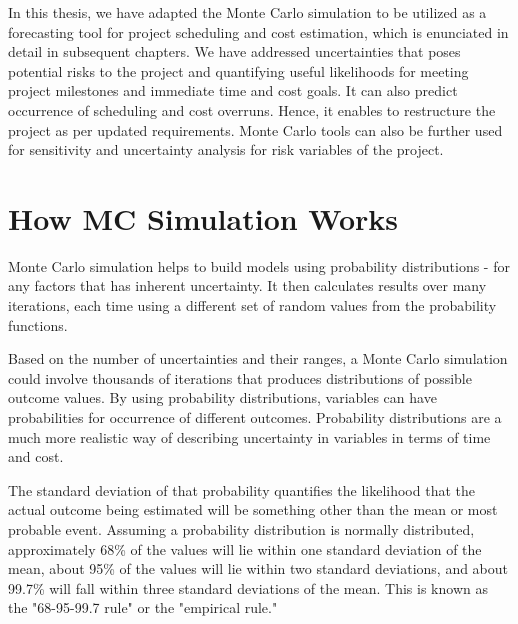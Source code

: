 In this thesis, we have adapted the Monte Carlo simulation to be utilized as a forecasting tool for project scheduling and cost estimation, which is enunciated in detail in subsequent chapters. We have addressed uncertainties that poses potential risks to the project and quantifying useful likelihoods for meeting project milestones and immediate time and cost goals. It can also predict occurrence of scheduling and cost overruns. Hence, it enables to restructure the project as per updated requirements. Monte Carlo tools can also be further used for sensitivity and uncertainty analysis for risk variables of the project. 

\section{How MC Simulation Works}

Monte Carlo simulation helps to build models using probability distributions - for any factors that has inherent uncertainty. It then calculates results over many iterations, each time using a different set of random values from the probability functions. 

Based on the number of uncertainties and their ranges, a Monte Carlo simulation could involve thousands of iterations that produces distributions of possible outcome values. By using probability distributions, variables can have probabilities for occurrence of different outcomes. Probability distributions are a much more realistic way of describing uncertainty in variables in terms of time and cost.

The standard deviation of that probability quantifies the likelihood that the actual outcome being estimated will be something other than the mean or most probable event. Assuming a probability distribution is normally distributed, approximately \cite{investopedia} 68\% of the values will lie within one standard deviation of the mean, about 95\% of the values will lie within two standard deviations, and about 99.7\% will fall within three standard deviations of the mean. This is known as the "68-95-99.7 rule" \cite{MCSimulation} or the "empirical rule."

